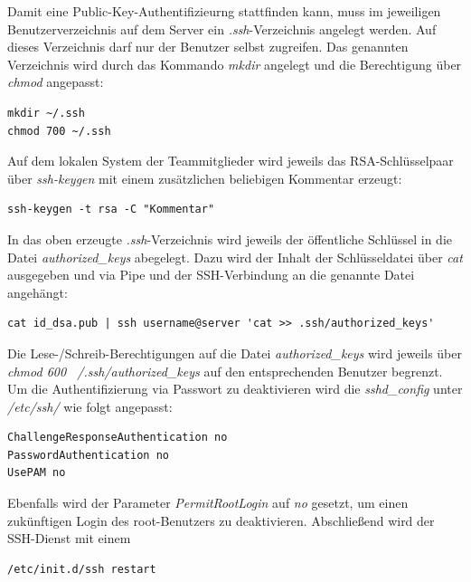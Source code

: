 Damit eine Public-Key-Authentifizieurng stattfinden kann, muss im jeweiligen Benutzerverzeichnis auf dem Server ein \textit{.ssh}-Verzeichnis angelegt werden. Auf dieses Verzeichnis darf nur der Benutzer selbst zugreifen. Das genannten Verzeichnis wird durch das Kommando \textit{mkdir} angelegt und die Berechtigung über \textit{chmod} angepasst:

\begin{lstlisting}[style=customc]
mkdir ~/.ssh
chmod 700 ~/.ssh
\end{lstlisting}

Auf dem lokalen System der Teammitglieder wird jeweils das RSA-Schlüsselpaar über \textit{ssh-keygen} mit einem zusätzlichen beliebigen Kommentar erzeugt:

\begin{lstlisting}[style=customc]
ssh-keygen -t rsa -C "Kommentar"
\end{lstlisting}

In das oben erzeugte \textit{.ssh}-Verzeichnis wird jeweils der öffentliche Schlüssel in die Datei \textit{authorized\_keys} abegelegt. Dazu wird der Inhalt der Schlüsseldatei über \textit{cat} ausgegeben und via Pipe und der SSH-Verbindung an die genannte Datei angehängt:

\begin{lstlisting}[style=customc]
cat id_dsa.pub | ssh username@server 'cat >> .ssh/authorized_keys'
\end{lstlisting}

Die Lese-/Schreib-Berechtigungen auf die Datei \textit{authorized\_keys} wird jeweils über \textit{chmod 600 ~/.ssh/authorized\_keys} auf den entsprechenden Benutzer begrenzt.\\

Um die Authentifizierung via Passwort zu deaktivieren wird die \textit{sshd\_config} unter \textit{/etc/ssh/} wie folgt angepasst:

\begin{lstlisting}[style=customc]
ChallengeResponseAuthentication no
PasswordAuthentication no
UsePAM no
\end{lstlisting}

Ebenfalls wird der Parameter \textit{PermitRootLogin} auf \textit{no} gesetzt, um einen zukünftigen Login des root-Benutzers zu deaktivieren. Abschließend wird der SSH-Dienst mit einem

\begin{lstlisting}[style=customc]
/etc/init.d/ssh restart
\end{lstlisting}

